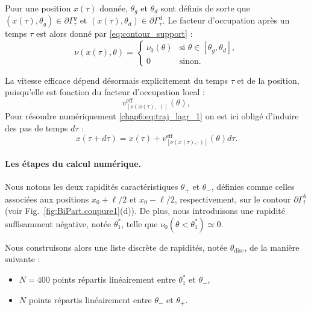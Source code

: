 Pour une position \(x(\tau)\) donnée, \(\theta_g\) et \(\theta_d\) sont définis de sorte que \((x(\tau), \theta_g) \in \partial \Gamma_\tau^g\) et \((x(\tau), \theta_d) \in \partial \Gamma_\tau^d\). Le facteur d’occupation après un temps \(\tau\) est alors donné par \eqref{eq:contour_support} :
\begin{equation}
	\label{eq:contour_exp}
	\nu ( x(\tau), \theta ) = 
		\begin{cases}
			\nu_0(\theta) & \text{si } \theta \in [\theta_g, \theta_d], \\
			0 & \text{sinon}.
		\end{cases}
\end{equation}

La vitesse efficace dépend désormais explicitement du temps $\tau$ et de la position, puisqu’elle est fonction du facteur d’occupation local :
\begin{equation}
	v^{\mathrm{eff}}_{[\nu(x(\tau),\cdot)]}(\theta),
\end{equation}
Pour résoudre numériquement \eqref{chap6:eq:traj_lagr_1} on est ici obligé d'induire des pas de temps $d\tau$ : 
\begin{equation}\label{chap6:eq.etalement.1}
	x(\tau +d\tau ) = x(\tau ) + v^{\mathrm{eff}}_{[\nu(x(\tau),\cdot)]} (\theta)d \tau.
\end{equation}

\medskip

\paragraph{Les étapes du calcul numérique.}
Nous notons les deux rapidités caractéristiques \(\theta_+\) et \(\theta_-\), définies comme celles associées aux positions \(x_0 + \ell/2\) et \(x_0 - \ell/2\), respectivement, sur le contour \(\partial \Gamma_t^b\) (voir Fig.~\ref{fig:BiPart.coupure1}(d)).  
De plus, nous introduisons une rapidité suffisamment négative, notée \(\theta_1^*\), telle que \(\nu_0(\theta<\theta_1^*) \simeq 0\).

\medskip

Nous construisons alors une liste discrète de rapidités, notée \(\theta_{\mathrm{disc}}\), de la manière suivante :
\begin{itemize}[label = $\bullet$]
	\item \(N=400\) points répartis linéairement entre \(\theta_1^*\) et \(\theta_-\),
	\item \(N\) points répartis linéairement entre \(\theta_-\) et \(\theta_+\).
\end{itemize}


